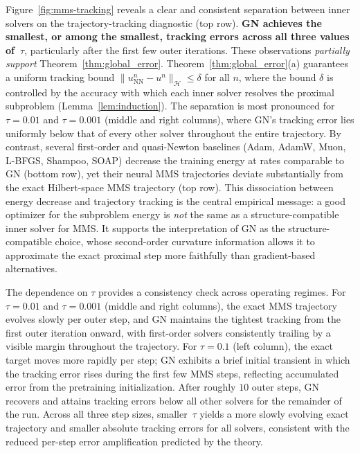 \documentclass[twoside,11pt]{article}
\newcommand{\calH}{\mathcal{H}}
\begin{document}
Figure~\ref{fig:mms-tracking} reveals a clear and consistent separation
between inner solvers on the trajectory-tracking diagnostic (top row).
\textbf{GN achieves the smallest, or among the smallest, tracking errors across all
three values of~$\tau$}, particularly after the first few outer iterations. These observations \emph{partially support} Theorem~\ref{thm:global_error}. Theorem~\ref{thm:global_error}(a) guarantees a uniform tracking bound $\|u^n_{\mathrm{NN}}-u^n\|_\calH\le\delta$ for all $n$, where the bound $\delta$ is controlled by the accuracy with which each inner solver resolves the proximal subproblem (Lemma~\ref{lem:induction}).
The separation is most pronounced for $\tau=0.01$ and $\tau=0.001$ (middle and right
columns), where GN's tracking error lies uniformly below that of every other solver
throughout the entire trajectory.
By contrast, several first-order and quasi-Newton baselines
(Adam, AdamW, Muon, L-BFGS, Shampoo, SOAP) decrease the training energy at rates
comparable to GN (bottom row), yet their neural MMS trajectories deviate substantially
from the exact Hilbert-space MMS trajectory (top row).
This dissociation between energy decrease and trajectory tracking is the central empirical
message: a good optimizer for the subproblem energy is \emph{not} the same as a
structure-compatible inner solver for MMS.  It supports the interpretation of GN as
the structure-compatible choice, whose second-order curvature information allows it to
approximate the exact proximal step more faithfully than gradient-based alternatives.

The dependence on $\tau$ provides a consistency check across operating
regimes.  For $\tau=0.01$ and $\tau=0.001$ (middle and right columns), the exact MMS
trajectory evolves slowly per outer step, and GN maintains the tightest tracking from
the first outer iteration onward, with first-order solvers consistently trailing by a
visible margin throughout the trajectory.  For $\tau=0.1$ (left column), the exact
target moves more rapidly per step; GN exhibits a brief initial transient in which the
tracking error rises during the first few MMS steps, reflecting accumulated error from
the pretraining initialization.  After roughly $10$ outer steps, GN recovers and attains
tracking errors below all other solvers for the remainder of the run.  Across all three
step sizes, smaller~$\tau$ yields a more slowly evolving exact trajectory and smaller
absolute tracking errors for all solvers, consistent with the reduced per-step error
amplification predicted by the theory.
\end{document}
